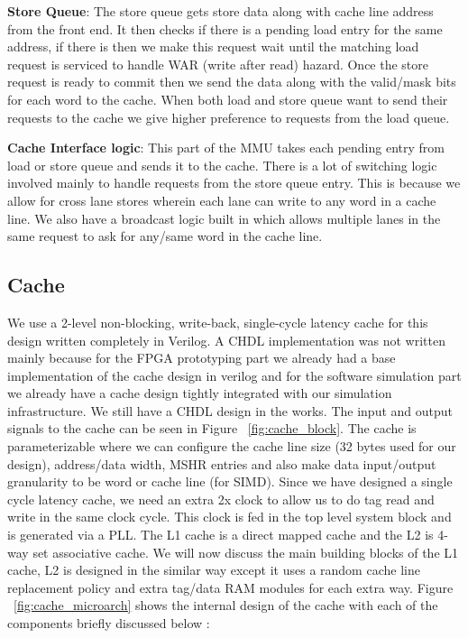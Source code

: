 \noindent\textbf{Store Queue}: The store queue gets store data along with cache line address from the front end. It then checks if there is a pending load entry for the same address, if there is then we make this request wait until the matching load request is serviced to handle WAR (write after read) hazard. Once the store request is ready to commit then we send the data along with the valid/mask bits for each word to the cache. When both load and store queue want to send their requests to the cache we give higher preference to requests from the load queue.

\noindent\textbf{Cache Interface logic}: This part of the MMU takes each pending entry from load or store queue and sends it to the cache. There is a lot of switching logic involved mainly to handle requests from the store queue entry. This is because we allow for cross lane stores wherein each lane can write to any word in a cache line. 
We also have a broadcast logic built in which allows multiple lanes in the same request to ask for any/same word in the cache line. 


\subsection{Cache}
We use a 2-level non-blocking, write-back, single-cycle latency cache for this design written completely in Verilog. A CHDL implementation was not written mainly because for the FPGA prototyping part we already had a base implementation of the cache design in verilog and for the software simulation part we already have a cache design tightly integrated with our simulation infrastructure. We still have a CHDL design in the works. 
The input and output signals to the cache can be seen in Figure ~\ref{fig:cache_block}. The cache is parameterizable where we can configure the cache line size (32 bytes used for our design), address/data width, MSHR entries and also make data input/output granularity to be word or cache line (for SIMD). Since we have designed a single cycle latency cache, we need an extra 2x clock to allow us to do tag read and write in the same clock cycle. This clock is fed in the top level system block and is generated via a PLL. The L1 cache is a direct mapped cache and the L2 is 4-way set associative cache. We will now discuss the main building blocks of the L1 cache, L2 is designed in the similar way except it uses a random cache line replacement policy and extra tag/data RAM modules for each extra way. Figure ~\ref{fig:cache_microarch} shows the internal design of the cache with each of the components briefly discussed below :

